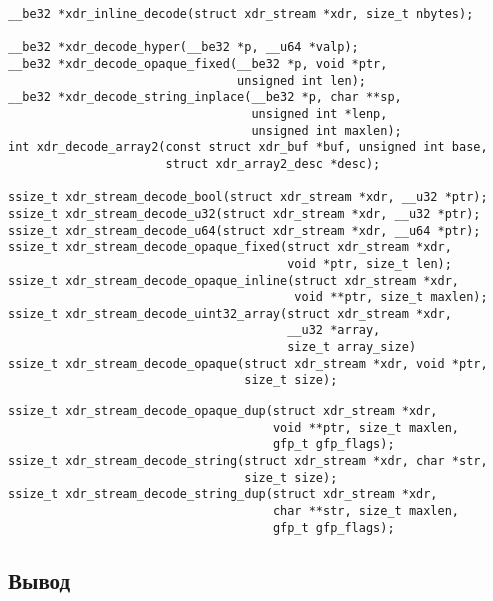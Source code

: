 \begin{lstlisting}[caption={Функции для декодирования (часть 1)}, label={lst:xdr_decode1}]
__be32 *xdr_inline_decode(struct xdr_stream *xdr, size_t nbytes);

__be32 *xdr_decode_hyper(__be32 *p, __u64 *valp);
__be32 *xdr_decode_opaque_fixed(__be32 *p, void *ptr,
                                unsigned int len);
__be32 *xdr_decode_string_inplace(__be32 *p, char **sp,
                                  unsigned int *lenp,
                                  unsigned int maxlen);
int xdr_decode_array2(const struct xdr_buf *buf, unsigned int base,
                      struct xdr_array2_desc *desc);

ssize_t xdr_stream_decode_bool(struct xdr_stream *xdr, __u32 *ptr);
ssize_t xdr_stream_decode_u32(struct xdr_stream *xdr, __u32 *ptr);
ssize_t xdr_stream_decode_u64(struct xdr_stream *xdr, __u64 *ptr);
ssize_t xdr_stream_decode_opaque_fixed(struct xdr_stream *xdr,
                                       void *ptr, size_t len);
ssize_t xdr_stream_decode_opaque_inline(struct xdr_stream *xdr,
                                        void **ptr, size_t maxlen);
ssize_t xdr_stream_decode_uint32_array(struct xdr_stream *xdr,
                                       __u32 *array,
                                       size_t array_size)
ssize_t xdr_stream_decode_opaque(struct xdr_stream *xdr, void *ptr,
                                 size_t size);
\end{lstlisting}
\begin{lstlisting}[caption={Функции для декодирования (часть 2)}, label={lst:xdr_decode2}]
ssize_t xdr_stream_decode_opaque_dup(struct xdr_stream *xdr,
                                     void **ptr, size_t maxlen,
                                     gfp_t gfp_flags);
ssize_t xdr_stream_decode_string(struct xdr_stream *xdr, char *str,
                                 size_t size);
ssize_t xdr_stream_decode_string_dup(struct xdr_stream *xdr,
                                     char **str, size_t maxlen,
                                     gfp_t gfp_flags);
\end{lstlisting}


\subsection*{Вывод}

